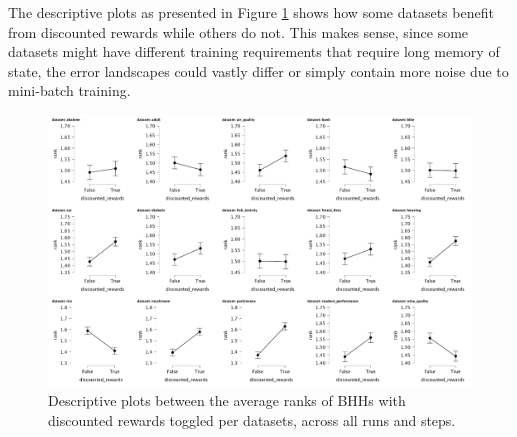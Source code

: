 \begin{table}[htbp]
	\centering
	\caption{Post Hoc Comparisons - BHH Variant: Discounted Rewards}
	\label{tab:results:discounted_rewards:post_hoc}%
	\par\bigskip
\end{table}

The descriptive plots as presented in Figure \ref{fig:results:discounted_rewards:descriptive:descriptive} shows how some datasets benefit from discounted rewards while others do not. This makes sense, since some datasets might have different training requirements that require long memory of state, the error landscapes could vastly differ or simply contain more noise due to mini-batch training.

\begin{figure}[htbp]
	\centering
	\includegraphics[width=\textwidth]{analysis/bhh_discounted_rewards/figures/descriptive/descriptive.png}
	\caption{Descriptive plots between the average ranks of \Acsp{BHH} with discounted rewards toggled per datasets, across all runs and steps.}
	\label{fig:results:discounted_rewards:descriptive:descriptive}
\end{figure}

